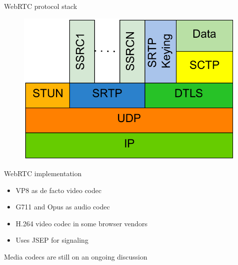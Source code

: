 \documentclass[first=red,second=purple,logo=yellowexc]{aaltoslides}
\begin{document}

\begin{frame}{WebRTC protocol stack}

\begin{figure}[h]
  \centering
  \includegraphics[width=1\textwidth]{protocolStack.pdf}
\end{figure}

\end{frame}

\begin{frame}{WebRTC implementation}

\begin{itemize}
\item VP8 as de facto video codec
\item G711 and Opus as audio codec
\item H.264 video codec in some browser vendors
\item Uses {\color{blue} JSEP} for signaling
\end{itemize}
\alert{Media codecs are still on an ongoing discussion}
\end{frame}

\end{document}
